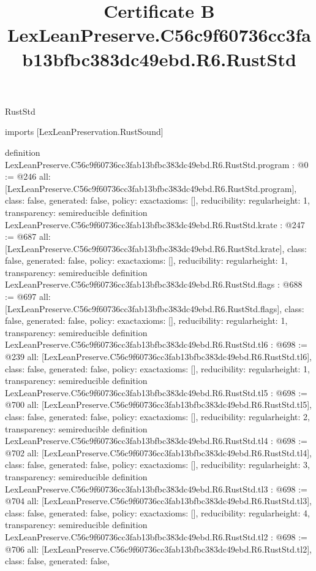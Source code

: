 \begin{lexlean}{RustStd}
\title{Certificate B LexLeanPreserve.C56c9f60736cc3fab13bfbc383dc49ebd.R6.RustStd}
\begin{coremodule}
imports [LexLeanPreservation.RustSound]

definition LexLeanPreserve.C56c9f60736cc3fab13bfbc383dc49ebd.R6.RustStd.program : @0 := @246 {
  all: [LexLeanPreserve.C56c9f60736cc3fab13bfbc383dc49ebd.R6.RustStd.program],
  class: false,
  generated: false,
  policy: exact{axioms: []},
  reducibility: regular{height: 1},
  transparency: semireducible
}
definition LexLeanPreserve.C56c9f60736cc3fab13bfbc383dc49ebd.R6.RustStd.krate : @247 := @687 {
  all: [LexLeanPreserve.C56c9f60736cc3fab13bfbc383dc49ebd.R6.RustStd.krate],
  class: false,
  generated: false,
  policy: exact{axioms: []},
  reducibility: regular{height: 1},
  transparency: semireducible
}
definition LexLeanPreserve.C56c9f60736cc3fab13bfbc383dc49ebd.R6.RustStd.flags : @688 := @697 {
  all: [LexLeanPreserve.C56c9f60736cc3fab13bfbc383dc49ebd.R6.RustStd.flags],
  class: false,
  generated: false,
  policy: exact{axioms: []},
  reducibility: regular{height: 1},
  transparency: semireducible
}
definition LexLeanPreserve.C56c9f60736cc3fab13bfbc383dc49ebd.R6.RustStd.tl6 : @698 := @239 {
  all: [LexLeanPreserve.C56c9f60736cc3fab13bfbc383dc49ebd.R6.RustStd.tl6],
  class: false,
  generated: false,
  policy: exact{axioms: []},
  reducibility: regular{height: 1},
  transparency: semireducible
}
definition LexLeanPreserve.C56c9f60736cc3fab13bfbc383dc49ebd.R6.RustStd.tl5 : @698 := @700 {
  all: [LexLeanPreserve.C56c9f60736cc3fab13bfbc383dc49ebd.R6.RustStd.tl5],
  class: false,
  generated: false,
  policy: exact{axioms: []},
  reducibility: regular{height: 2},
  transparency: semireducible
}
definition LexLeanPreserve.C56c9f60736cc3fab13bfbc383dc49ebd.R6.RustStd.tl4 : @698 := @702 {
  all: [LexLeanPreserve.C56c9f60736cc3fab13bfbc383dc49ebd.R6.RustStd.tl4],
  class: false,
  generated: false,
  policy: exact{axioms: []},
  reducibility: regular{height: 3},
  transparency: semireducible
}
definition LexLeanPreserve.C56c9f60736cc3fab13bfbc383dc49ebd.R6.RustStd.tl3 : @698 := @704 {
  all: [LexLeanPreserve.C56c9f60736cc3fab13bfbc383dc49ebd.R6.RustStd.tl3],
  class: false,
  generated: false,
  policy: exact{axioms: []},
  reducibility: regular{height: 4},
  transparency: semireducible
}
definition LexLeanPreserve.C56c9f60736cc3fab13bfbc383dc49ebd.R6.RustStd.tl2 : @698 := @706 {
  all: [LexLeanPreserve.C56c9f60736cc3fab13bfbc383dc49ebd.R6.RustStd.tl2],
  class: false,
  generated: false,
}
\end{coremodule}
\end{lexlean}
